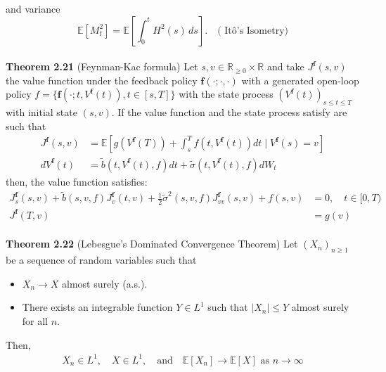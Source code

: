 \documentclass[oneside, a4paper, onecolumn, 11pt]{article}
\begin{document}
and variance  
\[
\mathbb{E} [ M_t^2 ] = \mathbb{E} \left[ \int_0^t H^2(s) \, ds \right].  \quad \text{(   Itô's Isometry)}
\]
\\\textbf{Theorem 2.21} (Feynman-Kac formula) \cite{Karatzas1991}
 Let $s,v \in \mathbb{R}_{\geq 0}\times \mathbb{R} $ and take $J^{\boldsymbol{f}}(s,v)$ the value function under the feedback policy  $\boldsymbol{f}(\cdot; \cdot, \cdot)$ with a generated open-loop policy $f = \{\boldsymbol{f}(\cdot; t,V^{\boldsymbol{f}}(t)), t \in [s,T]\}$ with  the state process $(V^{\boldsymbol{f}}(t))_{s\leq t \leq T}$ with initial state $(s,v)$. If the value function and the state process satisfy are such that
\begin{align*}
J^{\boldsymbol{f}}(s,v) &= \mathbb{E}\left[g\left(V^{\boldsymbol{f}}(T)\right) + \int_{s}^{T} f(t, V^{\boldsymbol{f}}(t))dt \mid V^{\boldsymbol{f}} (s) = v \right]\\ 
dV^{\boldsymbol{f}}(t) &= \tilde{b}(t,V^{\boldsymbol{f}}(t), f)dt + \tilde{\sigma}(t,V^{\boldsymbol{f}}(t), f) dW_t
\end{align*}
then, the value function satisfies:
\begin{align*}
    J_s^{\boldsymbol{f}}(s,v) + \tilde{b}(s,v, f)J_v^{\boldsymbol{f}}(t,v)  +  \frac{1}{2}\tilde{\sigma}^2(s,v, f)J_{vv}^{\boldsymbol{f}}(s,v) + f(s, v) &= 0, \quad t \in [0,T)\\
    J^{\boldsymbol{f}}(T,v) &= g(v)
\end{align*}
\\ \textbf{Theorem 2.22} (Lebesgue's Dominated Convergence Theorem) \cite{Jacod2004}
Let $(X_n)_{n \geq 1}$ be a sequence of random variables such that  
\begin{itemize}
    \item $X_n \to X$ almost surely (a.s.).
    \item There exists an integrable function $Y \in L^1$ such that $|X_n| \leq Y$ almost surely for all $n$.
\end{itemize}
Then,  
\begin{align*}
    X_n \in L^1, \quad X \in L^1, \quad \text{and} \quad \mathbb{E}[X_n] \to \mathbb{E}[X] \text{ as } n\to\infty
\end{align*}
\end{document}

